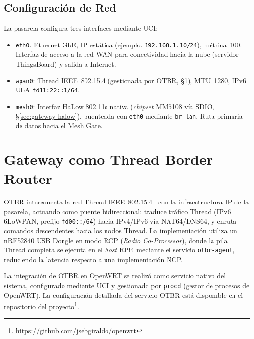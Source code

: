 \subsection{Configuración de Red}
\label{sec:gateway-openwrt-red}

La pasarela configura tres interfaces mediante UCI:

\begin{itemize}
    \item \texttt{eth0}: Ethernet GbE, IP estática (ejemplo: \texttt{192.168.1.10/24}), métrica~100.  Interfaz de acceso a la red WAN para conectividad hacia la nube (servidor ThingsBoard) y salida a Internet.
    \item \texttt{wpan0}: Thread IEEE~802.15.4 (gestionada por OTBR, §\ref{sec:gateway-otbr}), MTU~1280, IPv6 ULA \texttt{fd11:22::1/64}.
    \item \texttt{mesh0}: Interfaz HaLow 802.11s nativa (\emph{chipset} MM6108 vía SDIO, §\ref{sec:gateway-halow}), puenteada con \texttt{eth0} mediante \texttt{br-lan}.  Ruta primaria de datos hacia el Mesh Gate.
\end{itemize}


\section{Gateway como Thread Border Router}
\label{sec:gateway-otbr}

OTBR interconecta la red Thread IEEE~802.15.4~\cite{IEEE802154-2020} con la infraestructura IP de la pasarela, actuando como puente bidireccional: traduce tráfico Thread (IPv6 6LoWPAN, prefijo \texttt{fd00::/64}) hacia IPv4/IPv6 vía NAT64/DNS64, y enruta comandos descendentes hacia los nodos Thread.  La implementación utiliza un nRF52840 USB Dongle en modo RCP (\emph{Radio Co-Processor}), donde la pila Thread completa se ejecuta en el \emph{host} RPi4 mediante el servicio \texttt{otbr-agent}, reduciendo la latencia respecto a una implementación NCP.

La integración de OTBR en OpenWRT se realizó como servicio nativo del sistema, configurado mediante UCI y gestionado por \texttt{procd} (gestor de procesos de OpenWRT).  La configuración detallada del servicio OTBR está disponible en el repositorio del proyecto\footnote{\url{https://github.com/jsebgiraldo/openwrt}}.

